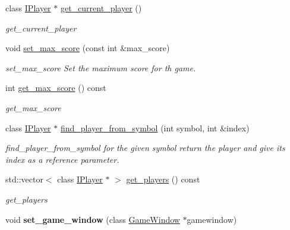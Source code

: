 \begin{DoxyCompactItemize}
class \hyperlink{class_i_player}{I\+Player} $\ast$ \hyperlink{class_tic_tac_toe_game_manager_aacdb43d784567d95b535e66e91aca832}{get\+\_\+current\+\_\+player} ()
\begin{DoxyCompactList}\small\item\em get\+\_\+current\+\_\+player \end{DoxyCompactList}\item 
void \hyperlink{class_tic_tac_toe_game_manager_a309645c05a8ae25efc3d99729af9910b}{set\+\_\+max\+\_\+score} (const int \&max\+\_\+score)
\begin{DoxyCompactList}\small\item\em set\+\_\+max\+\_\+score Set the maximum score for th game. \end{DoxyCompactList}\item 
int \hyperlink{class_tic_tac_toe_game_manager_a311fdd7f83b66a5cc7eeafe584455315}{get\+\_\+max\+\_\+score} () const
\begin{DoxyCompactList}\small\item\em get\+\_\+max\+\_\+score \end{DoxyCompactList}\item 
class \hyperlink{class_i_player}{I\+Player} $\ast$ \hyperlink{class_tic_tac_toe_game_manager_a791389179603563f9c90a25aa173ceb4}{find\+\_\+player\+\_\+from\+\_\+symbol} (int symbol, int \&index)
\begin{DoxyCompactList}\small\item\em find\+\_\+player\+\_\+from\+\_\+symbol for the given symbol return the player and give its index as a reference parameter. \end{DoxyCompactList}\item 
std\+::vector$<$ class \hyperlink{class_i_player}{I\+Player} $\ast$ $>$ \hyperlink{class_tic_tac_toe_game_manager_ac7a54acc425dd27e92f8ff3866a333a6}{get\+\_\+players} () const
\begin{DoxyCompactList}\small\item\em get\+\_\+players \end{DoxyCompactList}\item 
\mbox{\label{class_tic_tac_toe_game_manager_a2f3da6778543e6cf7b152570b7e1350d}} 
void {\bfseries set\+\_\+game\+\_\+window} (class \hyperlink{class_game_window}{Game\+Window} $\ast$gamewindow)
\end{DoxyCompactItemize}
